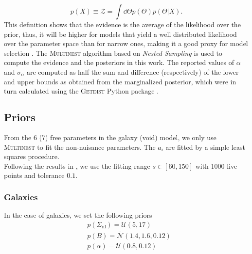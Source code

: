 \documentclass[fleqn, usenatbib]{mnras}
\begin{document}
\begin{equation}
p(X)\equiv\mathcal{Z} = \int\dd\Theta p(\Theta)p(\Theta|X).
\end{equation}
This definition shows that the evidence is the average of the likelihood over the prior, thus, it will be higher for models that yield a well distributed likelihood over the parameter space than for narrow ones, making it a good proxy for model selection \citep{Feroz2008}. The \textsc{Multinest} algorithm \citep{Feroz2008} based on \textit{Nested Sampling} \citep{Skilling2004} is used to compute the evidence and the posteriors in this work. The reported values of $\alpha$ and $\sigma_\alpha$ are computed as half the sum and difference (respectively) of the lower and upper bounds as obtained from the marginalized posterior, which were in turn calculated using the \textsc{Getdist} Python package \citep{Lewis2019}.
\subsection{Priors}
From the 6 (7) free parameters in the galaxy (void) model, we only use \textsc{Multinest} to fit the non-nuisance parameters. The $a_i$ are fitted by a simple least squares procedure.\\
Following the results in \citet{Zhao2019}, we use the fitting range $s\in[60, 150]$ with $\num{1000}$ live points and tolerance $\num{0.1}$.
\subsubsection{Galaxies}
In the case of galaxies, we set the following priors
\begin{align}
&p(\Sigma_{\mathrm{nl}}) = \mathcal{U}(5, 17)\\
&p(B) = \bar{\mathcal{N}}(1.4, 1.6, 0.12)\\
&p(\alpha)=\mathcal{U}(0.8, 0.12)
\end{align}
\end{document}
